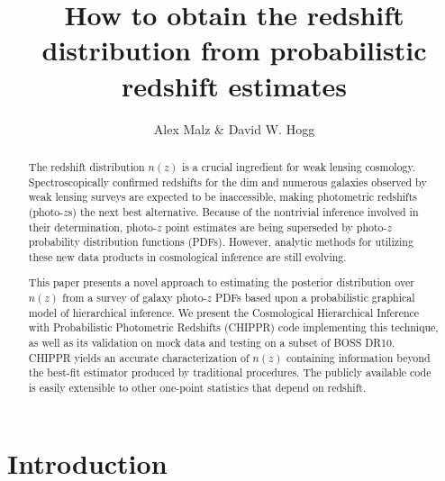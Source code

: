 \documentclass[preprint]{aastex}
\begin{document}
\title{How to obtain the redshift distribution from probabilistic redshift estimates}

\author{Alex Malz \& David W. Hogg}


\begin{abstract}
The redshift distribution $n(z)$ is a crucial ingredient for weak lensing cosmology.  Spectroscopically confirmed redshifts for the dim and numerous galaxies observed by weak lensing surveys are expected to be inaccessible, making photometric redshifts (photo-$z$s) the next best alternative.  Because of the nontrivial inference involved in their determination, photo-$z$ point estimates are being superseded by photo-$z$ probability distribution functions (PDFs).  However, analytic methods for utilizing these new data products in cosmological inference are still evolving.

This paper presents a novel approach to estimating the posterior distribution over $n(z)$ from a survey of galaxy photo-$z$ PDFs based upon a probabilistic graphical model of hierarchical inference.  We present the Cosmological Hierarchical Inference with Probabilistic Photometric Redshifts (CHIPPR) code implementing this technique, as well as its validation on mock data and testing on a subset of BOSS DR10.  CHIPPR yields an accurate characterization of $n(z)$ containing information beyond the best-fit estimator produced by traditional procedures.  The publicly available code is easily extensible to other one-point statistics that depend on redshift.

\end{abstract}


\section{Introduction}
\label{sec:introduction}
\end{document}
